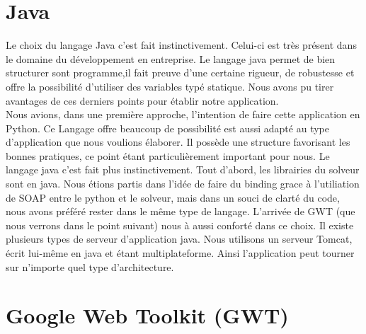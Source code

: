 \section{Java}
Le choix du langage Java c'est fait instinctivement. Celui-ci est très présent
dans le domaine du développement en entreprise. Le langage java permet de bien
structurer sont programme,il fait preuve d'une certaine rigueur, de robustesse
et offre la possibilité d'utiliser des variables typé statique. Nous avons pu
tirer avantages de ces derniers points pour établir notre application.\\
Nous avions, dans une première approche, l'intention de faire cette
application en Python. Ce Langage offre beaucoup de possibilité est aussi adapté
au type d'application que nous voulions élaborer. Il possède une structure
favorisant les bonnes pratiques, ce point étant particulièrement important pour
nous. Le langage java c'est fait plus instinctivement. Tout d'abord, les
librairies du solveur sont en java. Nous étions partis dans l'idée de faire du
binding grace à l'utiliation de SOAP entre le python et le solveur, mais
dans un souci de clarté du code, nous avons préféré rester dans le même type de
langage. L'arrivée de GWT (que nous verrons dans le point suivant) nous à aussi
conforté dans ce choix.
Il existe plusieurs types de serveur d'application java. Nous utilisons un
serveur Tomcat, écrit lui-même en java et étant multiplateforme. Ainsi
l'application peut tourner sur n'importe quel type d'architecture.




\section{Google Web Toolkit (GWT)}


